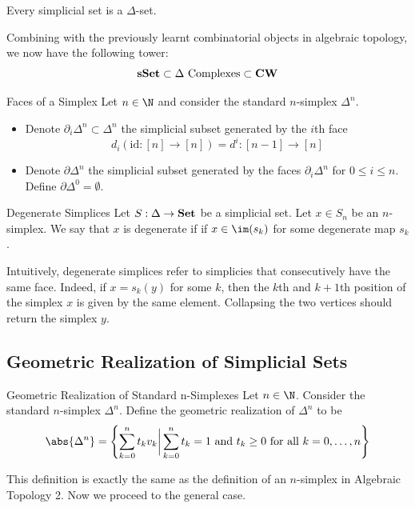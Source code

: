 \documentclass[a4paper]{article}
\begin{document}
\begin{prp}{}{} Every simplicial set is a $\Delta$-set. 
\end{prp}

Combining with the previously learnt combinatorial objects in algebraic topology, we now have the following tower: $$\bold{sSet}\subset\Delta\text{ Complexes}\subset\bold{CW}$$

\begin{defn}{Faces of a Simplex}{} Let $n\in\N$ and consider the standard $n$-simplex $\Delta^n$. 
\begin{itemize}
\item Denote $\partial_i\Delta^n\subset\Delta^n$ the simplicial subset generated by the $i$th face $$d_i(\text{id}:[n]\to[n])=d^i:[n-1]\to[n]$$
\item Denote $\partial\Delta^n$ the simplicial subset generated by the faces $\partial_i\Delta^n$ for $0\leq i\leq n$. Define $\partial\Delta^0=\emptyset$. 
\end{itemize}
\end{defn}

\begin{defn}{Degenerate Simplices}{} Let $S:\Delta\to\bold{Set}$ be a simplicial set. Let $x\in S_n$ be an $n$-simplex. We say that $x$ is degenerate if if $x\in\im(s_k)$ for some degenerate map $s_k$. 
\end{defn}

Intuitively, degenerate simplices refer to simplicies that consecutively have the same face. Indeed, if $x=s_k(y)$ for some $k$, then the $k$th and $k+1$th position of the simplex $x$ is given by the same element. Collapsing the two vertices should return the simplex $y$. 

\subsection{Geometric Realization of Simplicial Sets}
\begin{defn}{Geometric Realization of Standard n-Simplexes}{} Let $n\in\N$. Consider the standard $n$-simplex $\Delta^n$. Define the geometric realization of $\Delta^n$ to be $$\abs{\Delta^n}=\left\{\sum_{k=0}^nt_kv_k\bigg{|}\sum_{k=0}^nt_k=1\text{ and }t_k\geq 0\text{ for all }k=0,\dots,n\right\}$$
\end{defn}

This definition is exactly the same as the definition of an $n$-simplex in Algebraic Topology 2. Now we proceed to the general case. 
\end{document}

